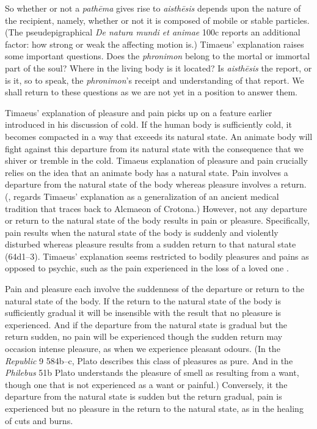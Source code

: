 So whether or not a \emph{pathēma} gives rise to \emph{aisthēsis} depends upon the nature of the recipient, namely, whether or not it is composed of mobile or stable particles. (The pseudepigraphical \emph{De natura mundi et animae} 100c reports an additional factor: how strong or weak the affecting motion is.) Timaeus' explanation raises some important questions. Does the \emph{phronimon} belong to the mortal or immortal part of the soul? Where in the living body is it located? Is \emph{aisthēsis} the report, or is it, so to speak, the \emph{phronimon}'s receipt and understanding of that report. We shall return to these questions as we are not yet in a position to answer them.

Timaeus' explanation of pleasure and pain picks up on a feature earlier introduced in his discussion of cold. If the human body is sufficiently cold, it becomes compacted in a way that exceeds its natural state. An animate body will fight against this departure from its natural state with the consequence that we shiver or tremble in the cold. Timaeus explanation of pleasure and pain crucially relies on the idea that an animate body has a natural state. Pain involves a departure from the natural state of the body whereas pleasure involves a return. (\citealt[448--9]{Taylor:1928qb}, regards Timaeus' explanation as a generalization of an ancient medical tradition that traces back to Alcmaeon of Crotona.) However, not any departure or return to the natural state of the body results in pain or pleasure. Specifically, pain results when the natural state of the body is suddenly and violently disturbed whereas pleasure results from a sudden return to that natural state (64d1--3). Timaeus' explanation seems restricted to bodily pleasures and pains as opposed to psychic, such as the pain experienced in the loss of a loved one \citep[447--8]{Taylor:1928qb}.

Pain and pleasure each involve the suddenness of the departure or return to the natural state of the body. If the return to the natural state of the body is sufficiently gradual it will be insensible with the result that no pleasure is experienced. And if the departure from the natural state is gradual but the return sudden, no pain will be experienced though the sudden return may occasion intense pleasure, as when we experience pleasant odours. (In the \emph{Republic} 9 584b--c, Plato describes this class of pleasures as pure. And in the \emph{Philebus} 51b Plato understands the pleasure of smell as resulting from a want, though one that is not experienced as a want or painful.) Conversely, it the departure from the natural state is sudden but the return gradual, pain is experienced but no pleasure in the return to the natural state, as in the healing of cuts and burns.

